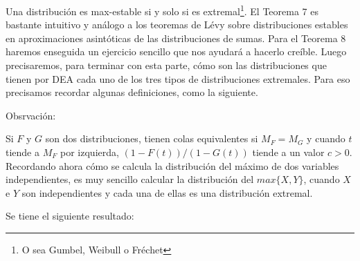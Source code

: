 \documentclass[
  12pt]{article}
\begin{document}
Una distribución es max-estable si y solo si es
extremal\footnote{O sea Gumbel, Weibull o Fréchet}. El Teorema 7 es
bastante intuitivo y análogo a los teoremas de Lévy sobre distribuciones
estables en aproximaciones asintóticas de las distribuciones de sumas.
Para el Teorema 8 haremos enseguida un ejercicio sencillo que nos
ayudará a hacerlo creíble. Luego precisaremos, para terminar con esta
parte, cómo son las distribuciones que tienen por DEA cada uno de los
tres tipos de distribuciones extremales. Para eso precisamos recordar
algunas definiciones, como la siguiente.

Obsrvación:

Si \(F\) y \(G\) son dos distribuciones, tienen colas equivalentes si
\(M_F=M_G\) y cuando \(t\) tiende a \(M_F\) por izquierda,
\((1-F(t))/(1-G(t))\) tiende a un valor \(c>0\). Recordando ahora cómo
se calcula la distribución del máximo de dos variables independientes,
es muy sencillo calcular la distribución del \(max\{X,Y\}\), cuando
\(X\) e \(Y\) son independientes y cada una de ellas es una distribución
extremal.

Se tiene el siguiente resultado:
\end{document}
